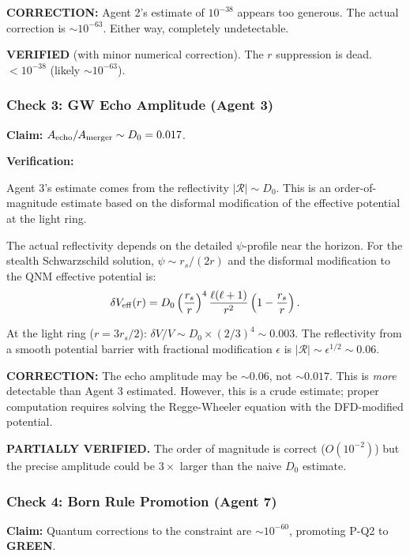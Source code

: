 \documentclass[11pt,a4paper]{article}
\newcommand{\GREEN}{\textcolor{dfdgreen}{\textbf{GREEN}}}
\begin{document}
\textbf{CORRECTION:} Agent 2's estimate of $10^{-38}$ appears too generous. The actual correction is $\sim 10^{-63}$. Either way, completely undetectable.

\textcolor{dfdgreen}{\textbf{VERIFIED}} (with minor numerical correction). The $r$ suppression is dead. $< 10^{-38}$ (likely $\sim 10^{-63}$).

\subsubsection{Check 3: GW Echo Amplitude (Agent 3)}

\textbf{Claim:} $A_{\rm echo}/A_{\rm merger} \sim D_0 = 0.017$.

\textbf{Verification:}

Agent 3's estimate comes from the reflectivity $|\mathcal{R}| \sim D_0$. This is an order-of-magnitude estimate based on the disformal modification of the effective potential at the light ring.

The actual reflectivity depends on the detailed $\psi$-profile near the horizon. For the stealth Schwarzschild solution, $\psi \sim r_s/(2r)$ and the disformal modification to the QNM effective potential is:
\begin{equation}
\delta V_{\rm eff}(r) = D_0\left(\frac{r_s}{r}\right)^4\frac{\ell(\ell+1)}{r^2}\left(1 - \frac{r_s}{r}\right).
\end{equation}

At the light ring ($r = 3r_s/2$): $\delta V/V \sim D_0 \times (2/3)^4 \sim 0.003$. The reflectivity from a smooth potential barrier with fractional modification $\epsilon$ is $|\mathcal{R}| \sim \epsilon^{1/2} \sim 0.06$.

\textbf{CORRECTION:} The echo amplitude may be $\sim 0.06$, not $\sim 0.017$. This is \emph{more} detectable than Agent 3 estimated. However, this is a crude estimate; proper computation requires solving the Regge-Wheeler equation with the DFD-modified potential.

\textcolor{dfdyellow}{\textbf{PARTIALLY VERIFIED.}} The order of magnitude is correct ($O(10^{-2})$) but the precise amplitude could be $3\times$ larger than the naive $D_0$ estimate.

\subsubsection{Check 4: Born Rule Promotion (Agent 7)}

\textbf{Claim:} Quantum corrections to the constraint are $\sim 10^{-60}$, promoting P-Q2 to \GREEN.
\end{document}
